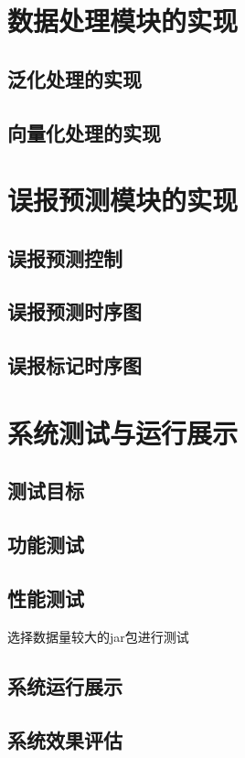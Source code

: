 

\section{数据处理模块的实现}

\subsection{泛化处理的实现}

\subsection{向量化处理的实现}


\section{误报预测模块的实现}

\subsection{误报预测控制}

\subsection{误报预测时序图}

\subsection{误报标记时序图}

\section{系统测试与运行展示}
\subsection{测试目标}
\subsection{功能测试}
\subsection{性能测试}
选择数据量较大的jar包进行测试
\subsection{系统运行展示}
\subsection{系统效果评估}
